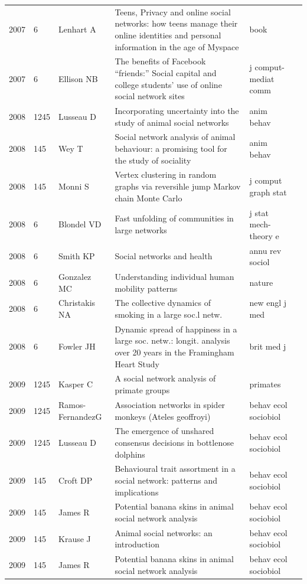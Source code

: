 \documentclass[11pt]{article} %
\begin{document}
\begin{landscape}
\begin{longtable}{p{0.7cm}|p{0.8cm}|p{3cm}|p{14.5cm}|p{3.5cm}l}
2007& 	6& 	 Lenhart A& 	 Teens, Privacy and  online social networks: how teens manage their online identities and personal information in the age of Myspace& 	book\\
2007& 	6& 	 Ellison NB & 	 The benefits of Facebook “friends:” Social capital and college students’ use of online social network sites& 	 j comput-mediat comm\\
2008& 	1245& 	 Lusseau D& 	 Incorporating uncertainty into the study of animal social networks& 	 anim behav\\
2008& 	145& 	 Wey T& 	 Social network analysis of animal behaviour: a promising tool for the study of sociality& 	 anim behav\\
2008& 	145& 	 Monni S& 	 Vertex clustering in random graphs via reversihle jump Markov chain Monte Carlo& 	 j comput graph stat\\
2008& 	6& 	 Blondel VD& 	 Fast unfolding of communities in large networks& 	 j stat mech-theory e\\
2008& 	6& 	 Smith KP& 	 Social networks and health& 	 annu rev sociol\\
2008& 	6& 	 Gonzalez MC& 	 Understanding individual human mobility patterns& 	 nature\\
2008& 	6& 	 Christakis NA& 	 The collective dynamics of smoking in a large soc.l netw.& 	 new engl j med\\
2008& 	6& 	 Fowler JH& 	 Dynamic spread of happiness in a large soc. netw.: longit. analysis over 20 years in the Framingham Heart Study& 	 brit med j\\
2009& 	1245& 	 Kasper C& 	 A social network analysis of primate groups& 	 primates\\
2009& 	1245& 	 Ramos-FernandezG& 	 Association networks in spider monkeys (Ateles geoffroyi)& 	 behav ecol sociobiol\\
2009& 	1245& 	 Lusseau D& 	 The emergence of unshared consensus decisions in bottlenose dolphins& 	 behav ecol sociobiol\\
2009& 	145& 	 Croft DP& 	 Behavioural trait assortment in a social network: patterns and implications& 	 behav ecol sociobiol\\
2009& 	145& 	 James R& 	 Potential banana skins in animal social network analysis& 	 behav ecol sociobiol\\
2009& 	145& 	 Krause J& 	 Animal social networks: an introduction& 	 behav ecol sociobiol\\
2009& 	145& 	 James R& 	 Potential banana skins in animal social network analysis& 	 behav ecol sociobiol\\

\end{longtable}
\end{landscape}
\end{document}
